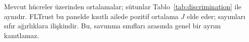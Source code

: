\begin{table}[!t]
\par\vspace{3pt}\parbox{\linewidth}{\footnotesize Mevcut hücreler üzerinden ortalamalar; sütunlar Tablo~\ref{tab:discrimination} ile aynıdır. FLTrust bu panelde kısıtlı ailede pozitif ortalama $J$ elde eder; sayımları sıfır ağırlıklara ilişkindir. Bu, savunma sınıfları arasında genel bir ayrım kanıtlamaz.}
\end{table}
